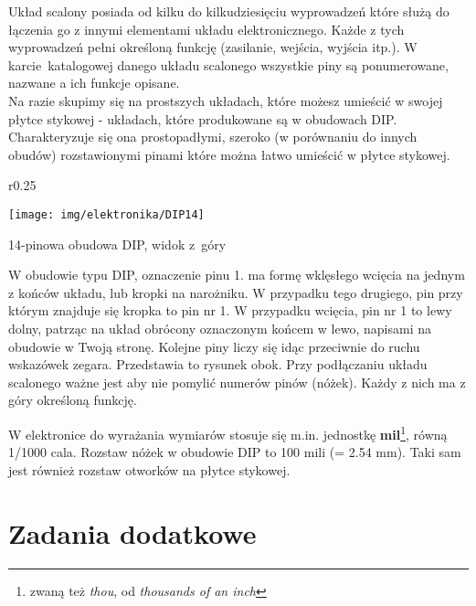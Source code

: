 \documentclass{pdfBooklets}
\begin{document}
Układ scalony posiada od kilku do kilkudziesięciu wyprowadzeń które służą do łączenia go z innymi elementami układu elektronicznego.
Każde z tych wyprowadzeń pełni określoną funkcję (zasilanie, wejścia, wyjścia itp.). W karcie~katalogowej danego układu scalonego wszystkie
piny są ponumerowane, nazwane a ich funkcje opisane.
\\

Na razie skupimy się na prostszych układach, które możesz umieścić w swojej płytce stykowej - układach, które produkowane są w obudowach DIP.
Charakteryzuje się ona prostopadłymi, szeroko (w porównaniu do innych obudów) rozstawionymi pinami które można łatwo umieścić w płytce stykowej.

\begin{wrapfigure}{r}{0.25\textwidth}
  \begin{center}
    \vspace{-20pt}
    \texttt{[image: img/elektronika/DIP14]}
    \vspace{-40pt}
    
    \small{14-pinowa obudowa DIP, widok z~góry}
    \vspace{-33pt}
  \end{center}
\end{wrapfigure}

W obudowie typu DIP, oznaczenie pinu 1. ma formę wklęsłego wcięcia na jednym z końców układu, lub kropki na narożniku. W przypadku tego drugiego, pin przy którym znajduje się kropka to pin nr 1. W przypadku wcięcia, pin nr 1 to lewy dolny, patrząc na układ obrócony oznaczonym końcem w lewo, napisami na obudowie w Twoją stronę. Kolejne piny liczy się idąc przeciwnie do ruchu wskazówek zegara. Przedstawia to rysunek obok.
Przy podłączaniu układu scalonego ważne jest aby nie pomylić numerów pinów (nóżek). Każdy z nich ma z góry określoną funkcję.

\begin{ProTip}{}
  W elektronice do wyrażania wymiarów stosuje się m.in. jednostkę \textbf{mil}\footnote{zwaną też \textit{thou}, od \textit{thousands of an inch}},
  równą 1/1000 cala. Rozstaw nóżek w obudowie DIP to 100 mili (= 2.54 mm). Taki sam jest również rozstaw otworków na płytce stykowej.
\end{ProTip}


\section{Zadania dodatkowe}
\end{document}
